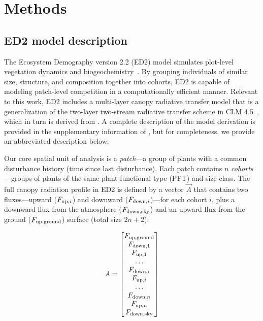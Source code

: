 \section{Methods}

\subsection{ED2 model description}

The Ecosystem Demography version 2.2 (ED2) model simulates plot-level vegetation dynamics and biogeochemistry~\citep{moorcroft_2001_method, medvigy2009mechanistic, longo_2019_ed1}.
By grouping individuals of similar size, structure, and composition together into cohorts, ED2 is capable of modeling patch-level competition in a computationally efficient manner.
Relevant to this work, ED2 includes a multi-layer canopy radiative transfer model that is a generalization of the two-layer two-stream radiative transfer scheme in CLM 4.5~\citep{clm45_note}, which in turn is derived from \citet{sellers1985canopy}.
A complete description of the model derivation is provided in the supplementary information of \citet{longo_2019_ed1}, but for completeness, we provide an abbreviated description below:

Our core spatial unit of analysis is a \emph{patch}---a group of plants with a common disturbance history (time since last disturbance).
Each patch contains $n$ \emph{cohorts}---groups of plants of the same plant functional type (PFT) and size class.
The full canopy radiation profile in ED2 is defined by a vector $\vec{A}$ that contains two fluxes---upward ($\relax{F}_{\mathrm{up},i}$) and downward ($F_{\mathrm{down},i}$)---for each cohort $i$, plus a downward flux from the atmosphere ($F_{\mathrm{down},\mathrm{sky}}$) and an upward flux from the ground ($F_{\mathrm{up},\mathrm{ground}}$) surface (total size $2n + 2$):

\begin{equation}
  \relax{A} =
  \begin{bmatrix}
    F_{\mathrm{up},\mathrm{ground}} \\
    F_{\mathrm{down},1} \\
    F_{\mathrm{up}, 1} \\
    \ldots \\
    F_{\mathrm{down},i} \\
    F_{\mathrm{up},i} \\
    \ldots \\
    F_{\mathrm{down},n} \\
    F_{\mathrm{up},n} \\
    F_{\mathrm{down},\mathrm{sky}}
  \end{bmatrix}
\end{equation}

